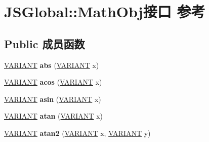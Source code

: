 \hypertarget{interface_j_s_global_1_1_math_obj}{}\section{J\+S\+Global\+:\+:Math\+Obj接口 参考}
\label{interface_j_s_global_1_1_math_obj}
\subsection*{Public 成员函数}
\begin{DoxyCompactItemize}
\item 
\mbox{\label{interface_j_s_global_1_1_math_obj_a2f2458f36410af95db78e794dd6997c9}} 
\hyperlink{structtag_v_a_r_i_a_n_t}{V\+A\+R\+I\+A\+NT} {\bfseries abs} (\hyperlink{structtag_v_a_r_i_a_n_t}{V\+A\+R\+I\+A\+NT} x)
\item 
\mbox{\label{interface_j_s_global_1_1_math_obj_a7b12d0af3d9806e93adcc729ef23bfb2}} 
\hyperlink{structtag_v_a_r_i_a_n_t}{V\+A\+R\+I\+A\+NT} {\bfseries acos} (\hyperlink{structtag_v_a_r_i_a_n_t}{V\+A\+R\+I\+A\+NT} x)
\item 
\mbox{\label{interface_j_s_global_1_1_math_obj_a200e41ded534fce49fa59423ed787fc7}} 
\hyperlink{structtag_v_a_r_i_a_n_t}{V\+A\+R\+I\+A\+NT} {\bfseries asin} (\hyperlink{structtag_v_a_r_i_a_n_t}{V\+A\+R\+I\+A\+NT} x)
\item 
\mbox{\label{interface_j_s_global_1_1_math_obj_ac8098db8b4ea533e27e05f6a29e70ee6}} 
\hyperlink{structtag_v_a_r_i_a_n_t}{V\+A\+R\+I\+A\+NT} {\bfseries atan} (\hyperlink{structtag_v_a_r_i_a_n_t}{V\+A\+R\+I\+A\+NT} x)
\item 
\mbox{\label{interface_j_s_global_1_1_math_obj_a91a29ca335d2e246f0e6710bb47c6959}} 
\hyperlink{structtag_v_a_r_i_a_n_t}{V\+A\+R\+I\+A\+NT} {\bfseries atan2} (\hyperlink{structtag_v_a_r_i_a_n_t}{V\+A\+R\+I\+A\+NT} x, \hyperlink{structtag_v_a_r_i_a_n_t}{V\+A\+R\+I\+A\+NT} y)
\item 
\mbox{\label{interface_j_s_global_1_1_math_obj_af3884fce9afa26c7f80d9f9909fea871}} 

\end{DoxyCompactItemize}
